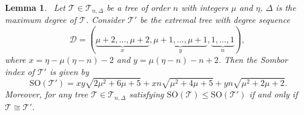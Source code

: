\documentclass[12pt, a4paper]{article}
\newtheorem{lemma}[theorem]{Lemma}
\newcommand{\TT}{\mathcal{T}}
\begin{document}
\begin{lemma}~\label{lemSomborIn1}
Let $\TT\in \TT_{n,\Delta}$ be a tree of order $n$ with integers $\mu$ and $\eta$, $\Delta$ is the maximum degree of $\TT$. Consider $\TT'$ be the extremal tree with degree sequence
\[
\mathscr{D}=(\underbrace{\mu+2,\dots,\mu+2}_{x},
 \underbrace{\mu+1,\dots,\mu+1}_{y},
 \underbrace{1,\dots,1}_{n}),
\]
where $x=\eta-\mu(\eta-n)-2$ and $y=\mu(\eta-n)-n+2$. Then the Sombor index of $\TT'$ is given by
\begin{equation}~\label{eqq1lemSomborIn1}
\mathrm{SO}(\TT')=xy\sqrt{2\mu^2+6\mu+5}+xn\sqrt{\mu^2+4\mu+5}+yn\sqrt{\mu^2+2\mu+2}.
\end{equation}
Moreover, for any tree $\TT\in \TT_{n,\Delta}$ satisfying $\mathrm{SO}(\TT)\leqslant \mathrm{SO}(\TT')$ if and only if $\TT\cong \TT'$.  
\end{lemma}
\end{document}
